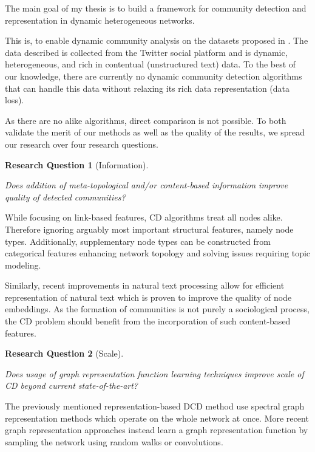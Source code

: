 \documentclass[
acmsmall,
nonacm,
screen,
acmthm]{acmart}
\newtheorem{rqq}{Research Question}
\begin{document}
The main goal of my thesis is to build a framework for community
detection and representation in dynamic heterogeneous networks.

This is, to enable dynamic community analysis on the datasets proposed
in \citet{wangPublicSentimentGovernmental2020}. The data described is
collected from the Twitter social platform and is dynamic,
heterogeneous, and rich in contentual (unstructured text) data. To the
best of our knowledge, there are currently no dynamic community
detection algorithms that can handle this data without relaxing its rich
data representation (data loss).

As there are no alike algorithms, direct comparison is not possible. To
both validate the merit of our methods as well as the quality of the
results, we spread our research over four research questions.

\begin{rqq}[Information]\label{rqq:rq1} 

\emph{Does addition of meta-topological and/or content-based information
improve quality of detected communities?}

\end{rqq}

While focusing on link-based features, CD algorithms treat all nodes
alike. Therefore ignoring arguably most important structural features,
namely node types. Additionally, supplementary node types can be
constructed from categorical features enhancing network topology and
solving issues requiring topic modeling.

Similarly, recent improvements in natural text processing allow for
efficient representation of natural text which is proven to improve the
quality of node embeddings. As the formation of communities is not
purely a sociological process, the CD problem should benefit from the
incorporation of such content-based features.

\begin{rqq}[Scale]\label{rqq:rq2} 

\emph{Does usage of graph representation function learning techniques
improve scale of CD beyond current state-of-the-art?}

\end{rqq}

The previously mentioned representation-based DCD method use spectral
graph representation methods which operate on the whole network at once.
More recent graph representation approaches instead learn a graph
representation function by sampling the network using random walks or
convolutions.
\end{document}

